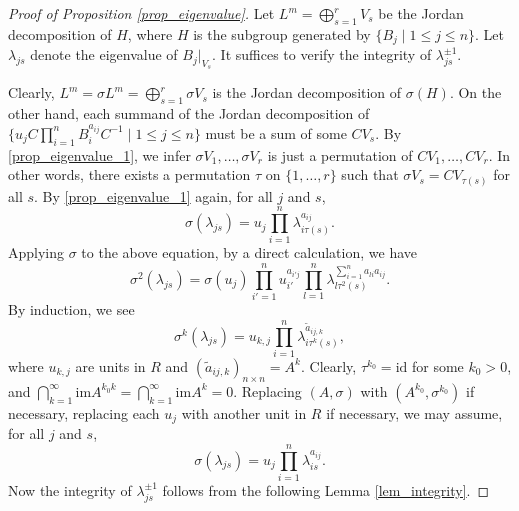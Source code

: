 \documentclass[12pt]{amsart}
\theoremstyle{plain}
\theoremstyle{definition}
\theoremstyle{question}
\theoremstyle{remark}
\theoremstyle{assumption}
\numberwithin{equation}{section}
\theoremstyle{bigthm}
\begin{document}
\begin{proof}[Proof of Proposition \ref{prop_eigenvalue}]
Let $L^{m} = \bigoplus_{s=1}^{r} V_{s}$ be the Jordan decomposition of $H$, where $H$ is the subgroup generated by $\{ B_{j} \mid 1 \leq j \leq n \}$. Let $\lambda_{js}$ denote the eigenvalue of $B_{j}|_{V_{s}}$. It suffices to verify the integrity of $\lambda_{js}^{\pm 1}$.

Clearly, $L^{m} = \sigma L^{m} = \bigoplus_{s=1}^{r} \sigma V_{s}$ is the Jordan decomposition of $\sigma (H)$. On the other hand, each summand of the Jordan decomposition of $\{ u_{j} C \prod_{i=1}^{n} B_{i}^{a_{ij}} C^{-1} \mid 1 \leq j \leq n \}$ must be a sum of some $CV_{s}$. By \eqref{prop_eigenvalue_1}, we infer $\sigma V_{1}, \dots, \sigma V_{r}$ is just a permutation of $CV_{1}, \dots, CV_{r}$. In other words, there exists a permutation $\tau$ on $\{ 1, \dots, r \}$ such that $\sigma V_{s} = C V_{\tau(s)}$ for all $s$. By \eqref{prop_eigenvalue_1} again, for all $j$ and $s$,
\[
\sigma (\lambda_{js}) = u_{j} \prod_{i=1}^{n} \lambda_{i \tau(s)}^{a_{ij}}.
\]
Applying $\sigma$ to the above equation, by a direct calculation, we have
\[
\sigma^{2} (\lambda_{js}) = \sigma (u_{j}) \prod_{i'=1}^{n} u_{i'}^{a_{i'j}} \prod_{l=1}^{n} \lambda_{l \tau^{2}(s)}^{\sum_{i=1}^{n} a_{li} a_{ij}}.
\]
By induction, we see
\begin{equation}\label{prop_eigenvalue_2}
\sigma^{k} (\lambda_{js}) = u_{k,j} \prod_{i=1}^{n} \lambda_{i \tau^{k}(s)}^{\tilde{a}_{ij,k}},
\end{equation}
where $u_{k,j}$ are units in $R$ and $(\tilde{a}_{ij,k})_{n \times n} = A^{k}$. Clearly, $\tau^{k_{0}} = \mathrm{id}$ for some $k_{0} >0$, and $\bigcap_{k=1}^{\infty} \mathrm{im} A^{k_{0}k} = \bigcap_{k=1}^{\infty} \mathrm{im} A^{k} =0$. Replacing $(A, \sigma)$ with $(A^{k_{0}}, \sigma^{k_{0}})$ if necessary, replacing each $u_{j}$ with another unit in $R$ if necessary, we may assume, for all $j$ and $s$,
\[
\sigma (\lambda_{js}) = u_{j} \prod_{i=1}^{n} \lambda_{is}^{a_{ij}}.
\]
Now the integrity of $\lambda_{js}^{\pm 1}$ follows from the following Lemma \ref{lem_integrity}.
\end{proof}
\end{document}
